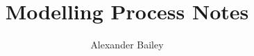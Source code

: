 \documentclass[12pt] {article}
\begin{document}
\title{Modelling Process Notes}
\author{Alexander Bailey}
\maketitle
\end{document}
